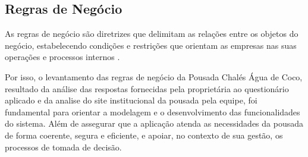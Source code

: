 \documentclass[
	12pt,				%
	openany,			%
	twoside,			%
	a4paper,			%
	english,			%
	french,				%
	spanish,			%
	brazil				%
	]{abntex2}
\begin{document}
\subsection{Regras de Negócio}
As regras de negócio são diretrizes que delimitam as relações entre os objetos do negócio, estabelecendo condições e restrições que orientam as empresas nas suas operações e processos internos \cite{ibmBusinessRules}. 

Por isso, o levantamento das regras de negócio da Pousada Chalés Água de Coco, resultado da análise das respostas fornecidas pela proprietária ao questionário aplicado e da analise do site institucional da pousada \cite{pousada_chales_agua_de_coco} pela equipe, foi fundamental para orientar a modelagem e o desenvolvimento das funcionalidades do sistema. Além de assegurar que a aplicação atenda as necessidades da pousada de forma coerente, segura  e eficiente, e apoiar, no contexto de sua gestão, os processos de tomada de decisão. 
\end{document}
